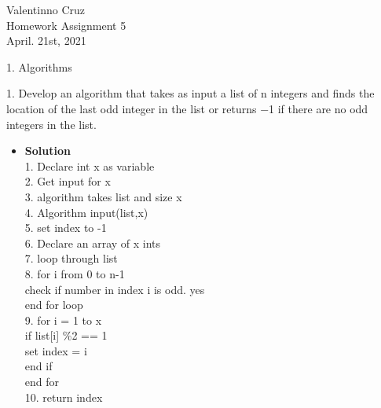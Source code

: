 \documentclass[11pt]{article}
\begin{document}
\begin{center}
    {\Large Valentinno Cruz\\
    Homework Assignment 5\\
    April. 21st, 2021\\}

\end{center}


\begin{flushleft}
{\Large 1. Algorithms}
\end{flushleft}





\begin{enumerate}

\begin{flushleft}
{\large 1. Develop an algorithm that takes as input a list of n integers and finds the location of the last odd
integer in the list or returns −1 if there are no odd integers in the list.}\\
\end{flushleft}





\begin{itemize}

\item \textbf{Solution}\\
\large 1. Declare int x as variable \\
\large 2. Get input for x\\
\large 3. algorithm takes list and size x\\
\large 4. Algorithm input(list,x)\\
\large 5. set index to -1 \\
\large 6. Declare an array of x ints\\
\large 7. loop through list\\
\large 8. for i from 0 to n-1\\
\large \hspace*{10mm} check if number in index i is odd. yes\\
\large \hspace*{5mm} end for loop \\
\large 9. for i = 1 to x\\
\large \hspace*{10mm} if list[i] \%2 == 1 \\
\large \hspace*{15mm} set index = i\\
\large \hspace*{10mm} end if \\
\large \hspace*{5mm}end for\\
\large 10. return index\\


\end {itemize}
\end {enumerate}
\end{document}
